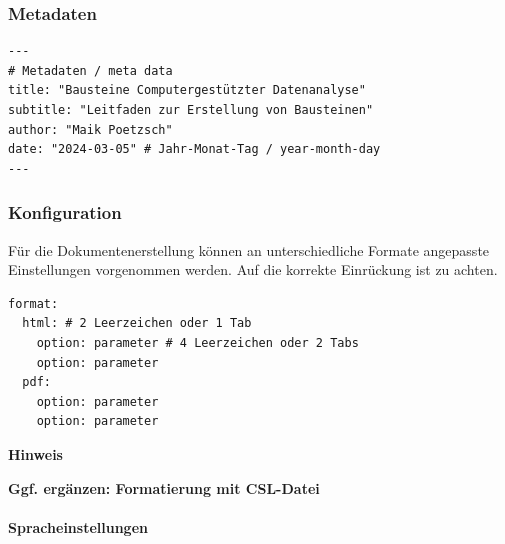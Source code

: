 \documentclass[
  letterpaper,
  DIV=11]{scrartcl}
\let\oldparagraph\paragraph
\renewcommand{\paragraph}[1]{\oldparagraph{#1}\mbox{}}
\begin{document}
\subsubsection{Metadaten}\label{metadaten}

\begin{verbatim}
---
# Metadaten / meta data
title: "Bausteine Computergestützter Datenanalyse"
subtitle: "Leitfaden zur Erstellung von Bausteinen"
author: "Maik Poetzsch"
date: "2024-03-05" # Jahr-Monat-Tag / year-month-day
---
\end{verbatim}

\subsubsection{Konfiguration}\label{konfiguration}

Für die Dokumentenerstellung können an unterschiedliche Formate
angepasste Einstellungen vorgenommen werden. Auf die korrekte Einrückung
ist zu achten.

\begin{verbatim}
format:
  html: # 2 Leerzeichen oder 1 Tab
    option: parameter # 4 Leerzeichen oder 2 Tabs
    option: parameter
  pdf:  
    option: parameter  
    option: parameter
\end{verbatim}

\begin{tcolorbox}[enhanced jigsaw, breakable, rightrule=.15mm, leftrule=.75mm, opacityback=0, colframe=quarto-callout-warning-color-frame, toprule=.15mm, left=2mm, colback=white, arc=.35mm, bottomrule=.15mm]
\begin{minipage}[t]{5.5mm}
\textcolor{quarto-callout-warning-color}{\faExclamationTriangle}
\end{minipage}%
\begin{minipage}[t]{\textwidth - 5.5mm}

\vspace{-3mm}\textbf{Hinweis}\vspace{3mm}

\textbf{Ggf. ergänzen: Formatierung mit CSL-Datei}

\end{minipage}%
\end{tcolorbox}

\paragraph{Spracheinstellungen}\label{spracheinstellungen}
\end{document}
